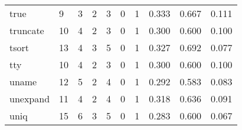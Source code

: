 \begin{longtable}{lp{2.0cm}p{2.0cm}p{2.0cm}p{2.0cm}p{2.0cm}p{2.0cm}p{2.0cm}p{2.0cm}p{2.0cm}}
true      &                      9 &                                             3 &                                            2 &                                           3 &                                            0 &                                          1 &                                0.333 &                                  0.667 &                                0.111 \\
truncate  &                     10 &                                             4 &                                            2 &                                           3 &                                            0 &                                          1 &                                0.300 &                                  0.600 &                                0.100 \\
tsort     &                     13 &                                             4 &                                            3 &                                           5 &                                            0 &                                          1 &                                0.327 &                                  0.692 &                                0.077 \\
tty       &                     10 &                                             4 &                                            2 &                                           3 &                                            0 &                                          1 &                                0.300 &                                  0.600 &                                0.100 \\
uname     &                     12 &                                             5 &                                            2 &                                           4 &                                            0 &                                          1 &                                0.292 &                                  0.583 &                                0.083 \\
unexpand  &                     11 &                                             4 &                                            2 &                                           4 &                                            0 &                                          1 &                                0.318 &                                  0.636 &                                0.091 \\
uniq      &                     15 &                                             6 &                                            3 &                                           5 &                                            0 &                                          1 &                                0.283 &                                  0.600 &                                0.067 \\

\end{longtable}

